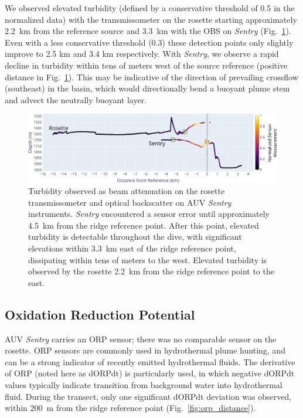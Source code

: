 We observed elevated turbidity (defined by a conservative threshold of 0.5 in the normalized data) with the transmissometer on the rosette starting approximately \SI{2.2}{\kilo\meter} from the reference source and \SI{3.3}{\kilo\meter} with the OBS on \emph{Sentry} (Fig.~\ref{fig:turbidity_distance}). Even with a less conservative threshold (0.3) these detection points only slightly improve to 2.5 km and 3.4 km respectively. With \emph{Sentry}, we observe a rapid decline in turbidity within tens of meters west of the source reference (positive distance in Fig.~\ref{fig:turbidity_distance}). This may be indicative of the direction of prevailing crossflow (southeast) in the basin, which would directionally bend a buoyant plume stem and advect the neutrally buoyant layer.

\begin{figure}[h!]
    \centering
    \includegraphics[width=\columnwidth]{figures/chap3_turbidity_over_distance.jpg}
    \caption{Turbidity observed as beam attenuation on the rosette transmissometer and optical backscatter on AUV \emph{Sentry} instruments. \emph{Sentry} encountered a sensor error until approximately \SI{4.5}{\kilo\meter} from the ridge reference point. After this point, elevated turbidity is detectable throughout the dive, with significant elevations within \SI{3.3}{\kilo\meter} east of the ridge reference point, dissipating within tens of meters to the west. Elevated turbidity is observed by the rosette \SI{2.2}{\kilo\meter} from the ridge reference point to the east.}
    \label{fig:turbidity_distance}
\end{figure}


\subsection{Oxidation Reduction Potential}
AUV \emph{Sentry} carries an ORP sensor; there was no comparable sensor on the rosette. ORP sensors are commonly used in hydrothermal plume hunting, and can be a strong indicator of recently emitted hydrothermal fluids. The derivative of ORP (noted here as dORPdt) is particularly used, in which negative dORPdt values typically indicate transition from background water into hydrothermal fluid. During the transect, only one significant dORPdt deviation was observed, within \SI{200}{\meter} from the ridge reference point (Fig.~\ref{fig:orp_distance}). 

